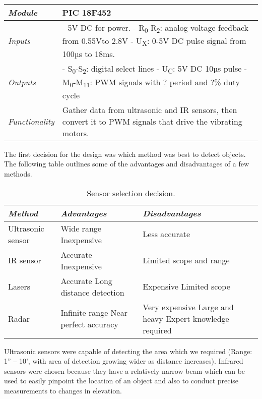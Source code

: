 \begin{table}
\begin{tabular}{|m{2cm}|m{10cm}|} \\ \hline
\emph{Module} & PIC 18F452 \\ \hline
\emph{Inputs} & - 5V DC for power.
- R\textsubscript{0}-R\textsubscript{2}: analog voltage feedback from
0.55Vto 2.8V
- U\textsubscript{X}: 0-5V DC pulse signal from 100µs to 18ms. \\ \hline
\emph{Outputs} & - S\textsubscript{0}-S\textsubscript{2}: digital select
lines
- U\textsubscript{C}: 5V DC 10µs pulse
- M\textsubscript{0}-M\textsubscript{11}: PWM signals with \ul{?} period
and \ul{?}\% duty cycle \\ \hline
\emph{Functionality} & Gather data from ultrasonic and IR sensors, then
convert it to PWM signals that drive the vibrating motors. \\ \hline
\end{tabular}
\end{table}

The first decision for the design was which method was best to detect
objects. The following table outlines some of the advantages and
disadvantages of a few methods.


\begin{table}
\caption{Sensor selection decision.}
\label{table:caseStudySensorDecision}
\begin{tabular}{|m{4cm}|m{4cm}|m{4cm}|} \hline
\emph{\textbf{Method}} & \emph{\textbf{Advantages}} & \emph{\textbf{Disadvantages}} \\ \hline
Ultrasonic sensor & Wide range Inexpensive & Less accurate \\ \hline
IR sensor & Accurate Inexpensive & Limited scope and range \\ \hline
Lasers & Accurate Long distance detection & Expensive Limited scope \\ \hline
Radar & Infinite range Near perfect accuracy & Very expensive Large and heavy Expert knowledge required \\ \hline
\end{tabular}
\end{table}

Ultrasonic sensors were capable of detecting the area which we required
(Range: 1'' -- 10', with area of detection growing wider as distance
increases). Infrared sensors were chosen because they have a relatively
narrow beam which can be used to easily pinpoint the location of an
object and also to conduct precise measurements to changes in elevation.

